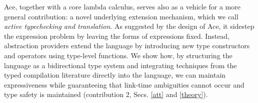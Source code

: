 \documentclass[10pt,preprint]{sigplanconf}
\newcommand{\lamAce}{\lambda_{\text{Ace}}}
\begin{document}
Ace, together with a core lambda calculus, serves also as a vehicle for a more general contribution: a novel  underlying extension mechanism, which we call \emph{active typechecking and translation}. As suggested by the design of Ace, it sidestep the expression problem by leaving the forms of expressions fixed. Instead, abstraction providers extend the language by introducing new type constructors and operators using type-level functions. We show how, by  structuring the language as a bidirectional type system and integrating techniques from the typed compilation literature directly into the language, we can maintain expressiveness while  guaranteeing that link-time ambiguities cannot occur and type safety is maintained (contribution 2, Secs. \ref{att} and \ref{theory}).






\end{document}
